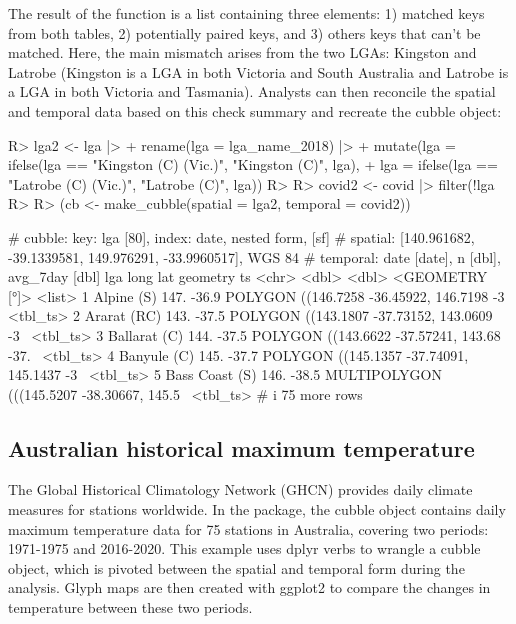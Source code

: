 \documentclass[
  shortnames]{jss}
\begin{document}
The result of the  function is a list containing three elements: 1) matched keys from both tables, 2) potentially paired keys, and 3) others keys that can't be matched. Here, the main mismatch arises from the two LGAs: Kingston and Latrobe (Kingston is a LGA in both Victoria and South Australia and Latrobe is a LGA in both Victoria and Tasmania). Analysts can then reconcile the spatial and temporal data based on this check summary and recreate the cubble object:

\begin{CodeChunk}
\begin{CodeInput}
R> lga2 <- lga |>
+   rename(lga = lga_name_2018) |> 
+   mutate(lga = ifelse(lga == "Kingston (C) (Vic.)", "Kingston (C)", lga),
+          lga = ifelse(lga == "Latrobe (C) (Vic.)", "Latrobe (C)", lga))
R>   
R> covid2 <- covid |> filter(!lga %
R> 
R> (cb <- make_cubble(spatial = lga2, temporal = covid2))
\end{CodeInput}
\begin{CodeOutput}
# cubble:   key: lga [80], index: date, nested form, [sf]
# spatial:  [140.961682, -39.1339581, 149.976291, -33.9960517], WGS 84
# temporal: date [date], n [dbl], avg_7day [dbl]
  lga             long   lat                                   geometry ts      
  <chr>          <dbl> <dbl>                             <GEOMETRY [°]> <list>  
1 Alpine (S)      147. -36.9 POLYGON ((146.7258 -36.45922, 146.7198 -3~ <tbl_ts>
2 Ararat (RC)     143. -37.5 POLYGON ((143.1807 -37.73152, 143.0609 -3~ <tbl_ts>
3 Ballarat (C)    144. -37.5 POLYGON ((143.6622 -37.57241, 143.68 -37.~ <tbl_ts>
4 Banyule (C)     145. -37.7 POLYGON ((145.1357 -37.74091, 145.1437 -3~ <tbl_ts>
5 Bass Coast (S)  146. -38.5 MULTIPOLYGON (((145.5207 -38.30667, 145.5~ <tbl_ts>
# i 75 more rows
\end{CodeOutput}
\end{CodeChunk}

\hypertarget{historicaltmax}{%
\subsection{Australian historical maximum temperature}\label{historicaltmax}}

The Global Historical Climatology Network (GHCN) provides daily climate measures for stations worldwide. In the  package, the cubble object  contains daily maximum temperature data for 75 stations in Australia, covering two periods: 1971-1975 and 2016-2020. This example uses dplyr verbs to wrangle a cubble object, which is pivoted between the spatial and temporal form during the analysis. Glyph maps are then created with ggplot2 to compare the changes in temperature between these two periods.
\end{document}
